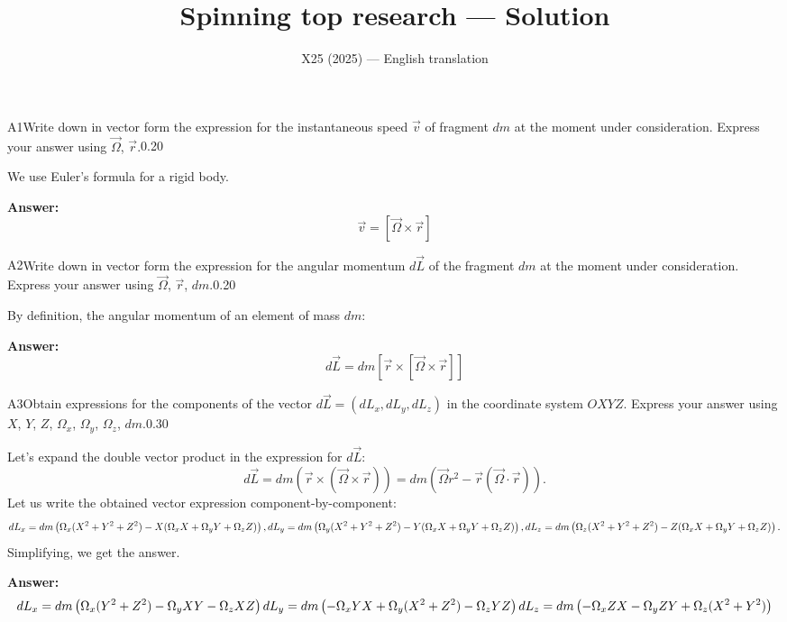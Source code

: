 \documentclass[11pt,a4paper]{article}
\title{\textbf{Spinning top research --- Solution}}
\author{\normalsize X25 (2025) — English translation}
\date{}
\begin{document}
\maketitle\vspace{-0.5em}
\begin{solcard}{A1}{Write down in vector form the expression for the instantaneous speed $\vec{v}$ of fragment $dm$ at the moment under consideration. Express your answer using $\vec{\Omega}$, $\vec{r}$.}{0.20}

We use Euler's formula for a rigid body.

\par\smallskip\noindent\textbf{Answer:} $$ \vec{v} = [\vec{\Omega} \times  \vec{r}] $$
\end{solcard}

\begin{solcard}{A2}{Write down in vector form the expression for the angular momentum $d\vec{L}$ of the fragment $dm$ at the moment under consideration. Express your answer using $\vec{\Omega}$, $\vec{r}$, $dm$.}{0.20}

By definition, the angular momentum of an element of mass $dm$:

\par\smallskip\noindent\textbf{Answer:} $$ d\vec{L} =dm [\vec{r}  \times  [\vec{\Omega} \times \vec{r}]] $$
\end{solcard}

\begin{solcard}{A3}{Obtain expressions for the components of the vector $d \vec{L} = (dL_x, dL_y, dL_z)$ in the coordinate system $OXYZ$. Express your answer using $X$, $Y$, $Z$, $\Omega_x$, $\Omega_y$, $\Omega_z$, $dm$.}{0.30}

Let's expand the double vector product in the expression for \(d\vec{L}\): $$ d\vec{L} =dm (\vec{r}  \times  (\vec{\Omega} \times \vec{r})) = dm (\vec{\Omega}r^2 - \vec{r}(\vec{\Omega} \cdot \vec{r})). $$Let us write the obtained vector expression component-by-component: $$ dL_x = dm\left(\Omega_x(X^2 + Y^2 + Z^2) - X(\Omega_xX + \Omega_y Y + \Omega_z Z)\right), \\ dL_y = dm\left(\Omega_y(X^2 + Y^2 + Z^2) - Y(\Omega_xX + \Omega_y Y + \Omega_z Z)\right), \\ dL_z = dm\left(\Omega_z(X^2 + Y^2 + Z^2) - Z(\Omega_xX + \Omega_y Y + \Omega_z Z)\right). $$ Simplifying, we get the answer.

\par\smallskip\noindent\textbf{Answer:} $$ dL_x = dm\left(\Omega_x(Y^2 + Z^2) - \Omega_y XY - \Omega_z XZ \right)  \\ dL_y = dm\left( - \Omega_x YX + \Omega_y(X^2 + Z^2) - \Omega_z YZ \right)  \\ dL_z = dm\left( - \Omega_x ZX - \Omega_y ZY + \Omega_z(X^2 + Y^2)\right) $$
\end{solcard}
\end{document}
